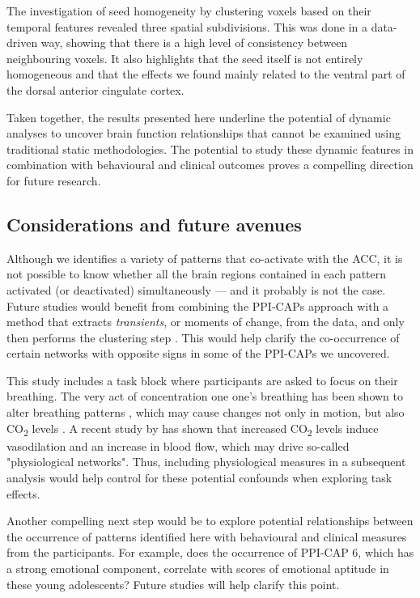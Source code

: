 The investigation of seed homogeneity by clustering voxels based on their temporal features revealed three spatial subdivisions. This was done in a data-driven way, showing that there is a high level of consistency between neighbouring voxels. It also highlights that the seed itself is not entirely homogeneous and that the effects we found mainly related to the ventral part of the dorsal anterior cingulate cortex. 

Taken  together, the results presented here underline the potential of dynamic analyses to uncover brain function relationships that cannot be examined using traditional static methodologies. The potential to study these dynamic features in combination with behavioural and clinical outcomes proves a compelling direction for future research. 






\subsection*{Considerations and future avenues}

Although we identifies a variety of patterns that co-activate with the ACC, it is not possible to know whether all the brain regions contained in each pattern activated (or deactivated) simultaneously --- and it probably is not the case. Future studies would benefit from combining the PPI-CAPs approach with a method that extracts \textit{transients}, or moments of change, from the data, and only then performs the clustering step \citep{Karahanoglu2015a,Freitas2020}. This would help clarify the co-occurrence of certain networks with opposite signs in some of the PPI-CAPs we uncovered. 

This study includes a task block where participants are asked to focus on their breathing. The very act of concentration one one's breathing has been shown to alter breathing patterns \citep{Conrad2007}, which may cause changes not only in motion, but also CO\textsubscript{2} levels \citep{Western1988}. A recent study by \citet{Chen2020} has shown that increased CO\textsubscript{2} levels induce vasodilation and an increase in blood flow, which may drive so-called "physiological networks". Thus, including physiological measures in a subsequent analysis would help control for these potential confounds when exploring task effects.


Another compelling next step would be to explore potential relationships between the occurrence of patterns identified here with behavioural and clinical measures from the participants. For example, does the occurrence of PPI-CAP 6, which has a strong emotional component, correlate with scores of emotional aptitude in these young adolescents? Future studies will help clarify this point.

